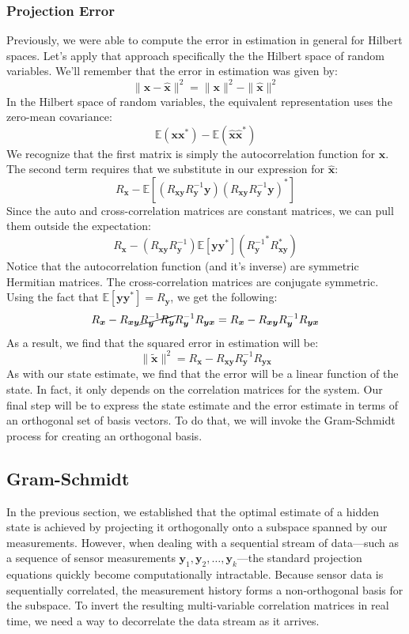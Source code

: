 \subsubsection{Projection Error}
Previously, we were able to compute the error in estimation in general for Hilbert spaces. Let's apply that approach specifically the the Hilbert space of random variables. We'll remember that the error in estimation was given by:
$$\|\bm{x}-\bm{\hat{x}}\|^2=\|\bm{x}\|^2-\|\bm{\hat{x}}\|^2$$
In the Hilbert space of random variables, the equivalent representation uses the zero-mean covariance:
$$\mathbb{E}(\bm{x\bm{x}^*})-\mathbb{E}(\bm{\hat{x}}\bm{\hat{x}}^*)$$
We recognize that the first matrix is simply the autocorrelation function for $\bm{x}$. The second term requires that we substitute in our expression for $\bm{\hat{x}}$:
$$R_{\bm{x}}-\mathbb{E}\left[\left(R_{\bm{xy}}R_{\bm{y}}^{-1}\bm{y}\right)\left(R_{\bm{xy}}R_{\bm{y}}^{-1}\bm{y}\right)^*\right]$$
Since the auto and cross-correlation matrices are constant matrices, we can pull them outside the expectation:
$$R_{\bm{x}}-\left(R_{\bm{xy}}R_{\bm{y}}^{-1}\right)\mathbb{E}\left[\bm{y}\bm{y}^*\right]\left({R_{\bm{y}}^{-1}}^*R_{\bm{xy}}^*\right)$$
Notice that the autocorrelation function (and it's inverse) are symmetric Hermitian matrices. The cross-correlation matrices are conjugate symmetric. Using the fact that $\mathbb{E}\left[\bm{y}\bm{y}^*\right]=R_{\bm{y}}$, we get the following:
$$R_{\bm{x}}-R_{\bm{xy}}\cancel{R_{\bm{y}}^{-1}R_{\bm{y}}}{R_{\bm{y}}^{-1}}R_{\bm{yx}}=R_{\bm{x}}-R_{\bm{xy}}{R_{\bm{y}}^{-1}}R_{\bm{yx}}$$
As a result, we find that the squared error in estimation will be:
$$\|\bm{\tilde{x}}\|^2=R_{\bm{x}}-R_{\bm{xy}}{R_{\bm{y}}^{-1}}R_{\bm{yx}}$$
As with our state estimate, we find that the error will be a linear function of the state. In fact, it only depends on the correlation matrices for the system. Our final step will be to express the state estimate and the error estimate in terms of an orthogonal set of basis vectors. To do that, we will invoke the Gram-Schmidt process for creating an orthogonal basis.

\subsection{Gram-Schmidt}

In the previous section, we established that the optimal estimate of a hidden state is achieved by projecting it orthogonally onto a subspace spanned by our measurements. However, when dealing with a sequential stream of data—such as a sequence of sensor measurements $\bm{y}_1, \bm{y}_2, \dots, \bm{y}_k$—the standard projection equations quickly become computationally intractable. Because sensor data is sequentially correlated, the measurement history forms a non-orthogonal basis for the subspace. To invert the resulting multi-variable correlation matrices in real time, we need a way to decorrelate the data stream as it arrives.


